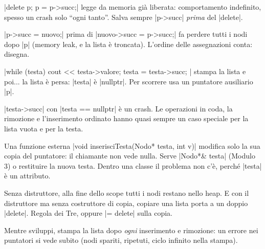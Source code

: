 \begin{trappola}
\cc|delete p; p = p->succ;| legge da memoria già liberata: comportamento indefinito,
spesso un crash solo ``ogni tanto''. Salva sempre \cc|p->succ| \emph{prima} del
\cc|delete|.
\end{trappola}

\begin{trappola}
\cc|p->succ = nuovo;| prima di \cc|nuovo->succ = p->succ;| fa perdere tutti i nodi dopo
\cc|p| (memory leak, e la lista è troncata). L'ordine delle assegnazioni conta:
disegna.
\end{trappola}

\begin{trappola}
\cc|while (testa) { cout << testa->valore; testa = testa->succ; }| stampa la lista e
poi... la lista è persa: \cc|testa| è \cc|nullptr|. Per scorrere usa un puntatore
ausiliario \cc|p|.
\end{trappola}

\begin{trappola}
\cc|testa->succ| con \cc|testa == nullptr| è un crash. Le operazioni in coda, la
rimozione e l'inserimento ordinato hanno quasi sempre un caso speciale per la lista
vuota e per la testa.
\end{trappola}

\begin{trappola}
Una funzione esterna \cc|void inserisciTesta(Nodo* testa, int v)| modifica solo la sua
copia del puntatore: il chiamante non vede nulla. Serve \cc|Nodo*& testa| (Modulo 3) o
restituire la nuova testa. Dentro una classe il problema non c'è, perché \cc|testa| è
un attributo.
\end{trappola}

\begin{trappola}
Senza distruttore, alla fine dello scope tutti i nodi restano nello heap. E con il
distruttore ma senza costruttore di copia, copiare una lista porta a un doppio
\cc|delete|. Regola dei Tre, oppure \cc|= delete| sulla copia.
\end{trappola}

\begin{consiglio}
Mentre sviluppi, stampa la lista dopo \emph{ogni} inserimento e rimozione: un errore
nei puntatori si vede subito (nodi spariti, ripetuti, ciclo infinito nella stampa).
\end{consiglio}

